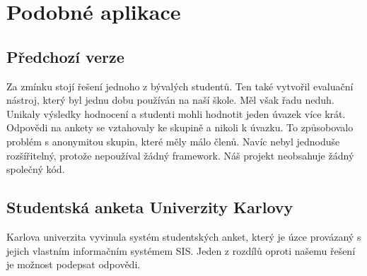 \section{Podobné aplikace}
\subsection{Předchozí verze}\label{uvod:predchozi-verze}
Za zmínku stojí řešení jednoho z bývalých studentů.
Ten také vytvořil evaluační nástroj, který byl jednu dobu používán na naší škole.
Měl však řadu neduh.
Unikaly výsledky hodnocení a studenti mohli hodnotit jeden úvazek více krát. Odpovědi na ankety se vztahovaly ke skupině a nikoli k úvazku. To způsobovalo problém s anonymitou skupin, které měly málo členů. Navíc nebyl jednoduše rozšířitelný, protože nepoužíval žádný framework. Náš projekt neobsahuje žádný společný kód.
\subsection{Studentská anketa Univerzity Karlovy}
Karlova univerzita vyvinula systém studentských anket, který je úzce provázaný s jejich vlastním informačním systémem SIS.  Jeden z rozdílů oproti našemu řešení je možnost podepsat odpovědi.\cite{matfyz-anketa}
